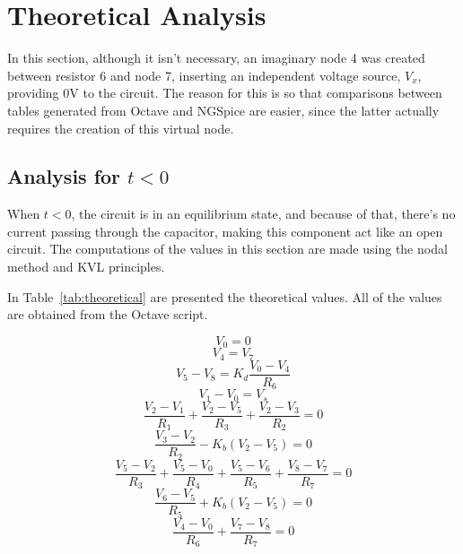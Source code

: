 \section{Theoretical Analysis}
\label{sec:analysis}

In this section, although it isn't necessary, an imaginary node 4 was created between resistor 6 and node 7, inserting an independent voltage source, $V_x$, providing 0V to the circuit. The reason for this is so that comparisons between tables generated from Octave and NGSpice are easier, since the latter actually requires the creation of this virtual node.

\subsection{Analysis for $t<0$} 
 When $t<0$, the circuit is in an equilibrium state, and because of that, there's no current passing through the capacitor, making this component act like an open circuit. The computations of the values in this section are made using the nodal method and KVL principles.
\par
In {Table~\ref{tab:theoretical}} are presented the theoretical values. All of the values are obtained from the Octave script.

    
\begin {equation}
V_0 = 0
\label{eq:n1}
\end{equation}
\begin {equation}
V_4 = V_7
\label{eq:n2}
\end{equation}
\begin {equation}
	V_5 - V_8 = K_d \frac{V_0 - V_4}{R_6}
	\label{eq:n3}
\end{equation}
\begin {equation}
	V_1 - V_0 = V_s
	\label{eq:n4}
\end{equation}
\begin {equation}
	\frac{V_2-V_1}{R_1} + \frac{V_2 - V_5}{R_3} + \frac{V_2 - V_3}{R_2} = 0
	\label{eq:n5}
\end{equation}
\begin {equation}
	\frac{V_3-V_2}{R_2} - K_b(V_2-V_5)  = 0
	\label{eq:n6}
\end{equation}
\begin {equation}
	\frac{V_5-V_2}{R_3} + \frac{V_5-V_0}{R_4} + \frac{V_5-V_6}{R_5} + \frac{V_8-V_7}{R_7}= 0
	\label{eq:n7}
\end{equation}
\begin {equation}
	\frac{V_6-V_5}{R_5} + K_b(V_2-V_5)  = 0
	\label{eq:n8}
\end{equation}
\begin {equation}
	\frac{V_4-V_0}{R_6} + \frac{V_7 - V_8}{R_7} = 0
	\label{eq:n9}
\end{equation}



